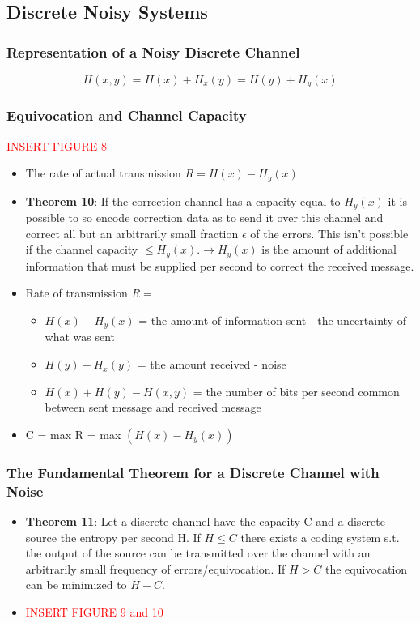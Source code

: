 \documentclass[leqno,twocolumn]{article}
\begin{document}
\subsection{Discrete Noisy Systems}
\subsubsection{Representation of a Noisy Discrete Channel}
\[ H(x,y) = H(x) + H_x(y) = H(y) + H_y(x) \]

\subsubsection{Equivocation and Channel Capacity}
\textcolor{red}{INSERT FIGURE 8}
\begin{itemize}
\item The rate of actual transmission $R = H(x) - H_y(x)$
\item \textbf{Theorem 10}: If the correction channel has a capacity equal to $H_y(x)$ it is possible to so encode correction data as to send it over this channel and correct all but an arbitrarily small fraction $\epsilon$ of the errors. This isn't possible if the channel capacity $\leq H_y(x). \rightarrow H_y(x)$ is the amount of additional information that must be supplied per second to correct the received message.
\item Rate of transmission $R =$
\begin{itemize}
\item $H(x) - H_y(x)$ = the amount of information sent - the uncertainty of what was sent
\item $H(y) - H_x(y)$ = the amount received - noise
\item $H(x) + H(y) - H(x,y)$ = the number of bits per second common between sent message and received message
\end{itemize}
\item C = max R = max $(H(x) - H_y(x))$
\end{itemize}

\subsubsection{The Fundamental Theorem for a Discrete Channel with Noise}
\begin{itemize}
\item \textbf{Theorem 11}: Let a discrete channel have the capacity C and a discrete source the entropy per second H. If $H \leq C$ there exists a coding system s.t. the output of the source can be transmitted over the channel with an arbitrarily small frequency of errors/equivocation. If $H > C$ the equivocation can be minimized to $H-C$.
\item \textcolor{red}{INSERT FIGURE 9 and 10}
\end{itemize}
\end{document}
